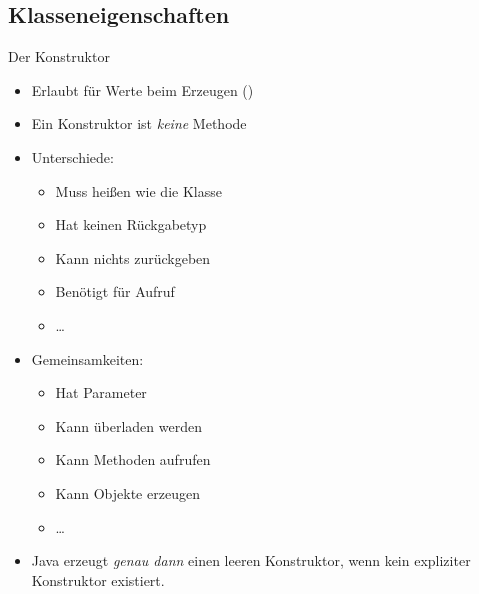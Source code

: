 {\subsection{Klasseneigenschaften}
\begin{frame}{Der Konstruktor}
\begin{itemize}[<+(1)->]
   \itemsep6pt
   \item Erlaubt für Werte beim Erzeugen ()
   \item Ein Konstruktor ist \textit{keine} Methode\vspace*{-\topsep}
\end{itemize}
\begin{multicols}{2}
\begin{itemize}[<+(1)->]
   \item Unterschiede: \begin{itemize}
      \item Muss heißen wie die Klasse
      \item Hat keinen Rückgabetyp
      \item Kann nichts zurückgeben
      \item Benötigt  für Aufruf
      \item \ldots
   \end{itemize}
   \item Gemeinsamkeiten:
   \begin{itemize}
      \item Hat Parameter
      \item Kann überladen werden
      \item Kann Methoden aufrufen
      \item Kann Objekte erzeugen
      \item \ldots
   \end{itemize}
\end{itemize}
\end{multicols}
\begin{itemize}[<+(1)->]
   \item Java erzeugt \textit{genau dann} einen leeren Konstruktor, wenn kein expliziter Konstruktor existiert.
\end{itemize}
\end{frame}

}
